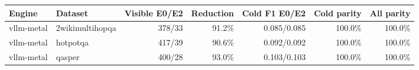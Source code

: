 \begin{tabular}{llrrrrr}
\toprule
Engine & Dataset & Visible E0/E2 & Reduction & Cold F1 E0/E2 & Cold parity & All parity \\
\midrule
vllm-metal & 2wikimultihopqa & 378/33 & 91.2\% & 0.085/0.085 & 100.0\% & 100.0\% \\
vllm-metal & hotpotqa & 417/39 & 90.6\% & 0.092/0.092 & 100.0\% & 100.0\% \\
vllm-metal & qasper & 400/28 & 93.0\% & 0.103/0.103 & 100.0\% & 100.0\% \\
\bottomrule
\end{tabular}

